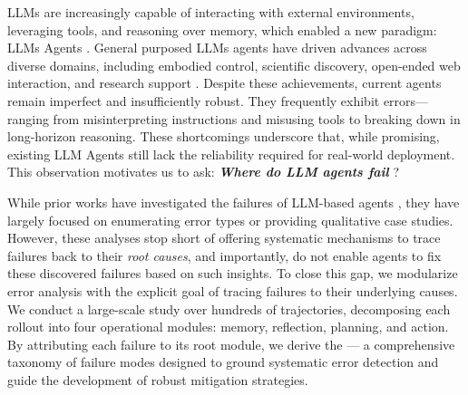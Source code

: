 
LLMs are increasingly capable of interacting with external environments, leveraging tools, and reasoning over memory, which enabled a new paradigm: LLMs Agents \citep{schick2023toolformer, qin2023toolllm, packer2023memgpt, shinn2023reflexion,liu2025advanceschallengesfoundationagents}. General purposed LLMs agents have driven advances across diverse domains, including embodied control, scientific discovery, open-ended web interaction, and research support \citep{zhou2023webarena, li2025metal, hong2025embodiedwebagentsbridging, zhu2025safescientistriskawarescientificdiscoveries}. Despite these achievements, current agents remain imperfect and insufficiently robust. They frequently exhibit errors—ranging from misinterpreting instructions and misusing tools to breaking down in long-horizon reasoning. These shortcomings underscore that, while promising, existing LLM Agents still lack the reliability required for real-world deployment. This observation motivates us to ask: \textit{\textbf{Where do LLM agents fail}} ?

While prior works have investigated the failures of LLM-based agents \citep{ji2024testing, sung2025verila, ning2024defining, cemri2025why, zhang2025which}, they have largely focused on enumerating error types or providing qualitative case studies. However, these analyses stop short of offering systematic mechanisms to trace failures back to their \textit{root causes}, and importantly, do not enable agents to fix these discovered failures based on such insights. To close this gap, we modularize error analysis with the explicit goal of tracing failures to their underlying causes. We conduct a large-scale study over hundreds of trajectories, decomposing each rollout into four operational modules: memory, reflection, planning, and action. By attributing each failure to its root module, we derive the \AET{} — a comprehensive taxonomy of failure modes designed to ground systematic error detection and guide the development of robust mitigation strategies. 

